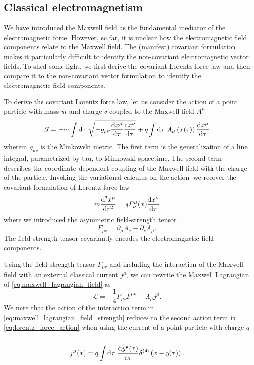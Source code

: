 \subsection{Classical electromagnetism}

We have introduced the Maxwell field as the fundamental mediator of the electromagnetic force.
However, so far, it is unclear how the electromagnetic field components relate to the Maxwell field.
The (manifest) covariant formulation makes it particularly difficult to identify the non-covariant electromagnetic vector fields.
To shed some light, we first derive the covariant Lorentz force law and then compare it to the non-covariant vector formulation to identify the electromagnetic field components.

To derive the covariant Lorentz force law, let us consider the action of a point particle with mass $m$ and charge $q$ coupled to the Maxwell field $A^\mu$~\cite[p.~244]{Zee2013}
\begin{equation}
	S
	=
	-
	m\int\dd{\tau}
	\sqrt{-g_{\mu\nu}\odv{x^\mu}{\tau}\odv{x^\nu}{\tau}}
	+
	q\int\dd{\tau}
	A_\mu\left(x(\tau)\right)
	\odv{x^\mu}{\tau}
	\label{eq:lorentz_force_action}
\end{equation}
wherein $g_{\mu\nu}$ is the Minkowski metric.
The first term is the generalization of a line integral, parametrized by tau, to Minkowski spacetime.
The second term describes the coordinate-dependent coupling of the Maxwell field with the charge of the particle.
Invoking the variational calculus on the action, we recover the covariant formulation of Lorentz force law
\begin{equation}
	m
	\odv[order={2}]{x^\mu}{\tau}
	=
	qF^\mu_\nu(x)\odv{x^\nu}{\tau}
	\label{eq:covariant_lorentz_force}
\end{equation}
where we introduced the asymmetric field-strength tensor
\begin{equation}
	F_{\mu\nu}
	=
	\partial_\mu
	A_\nu
	-
	\partial_\nu
	A_\mu
	\label{eq:field_strength_tensor}
	.
\end{equation}
The field-strength tensor covariantly encodes the electromagnetic field components.

Using the field-strength tensor $F_{\mu\nu}$ and including the interaction of the Maxwell field with an external classical current $j^\mu$, we can rewrite the Maxwell Lagrangian of \cref{eq:maxwell_lagrangian_field} as
\begin{equation}
	\mathcal{L}
	=
	-
	\frac{1}{4}
	F_{\mu\nu}
	F^{\mu\nu}
	+
	A_\mu j^\mu
	\label{eq:maxwell_lagrangian_field_strength}
	.
\end{equation}
We note that the action of the interaction term in \cref{eq:maxwell_lagrangian_field_strength} reduces to the second action term in \cref{eq:lorentz_force_action} when using the current of a point particle with charge $q$~\cite[p.~177]{Peskin1995}
\begin{equation}
	j^\mu(x)
	=
	q
	\int\dd{\tau}
	\odv{y^\mu(\tau)}{\tau}
	\delta^{(4)}\left(x-y(\tau)\right)
	.
\end{equation}

